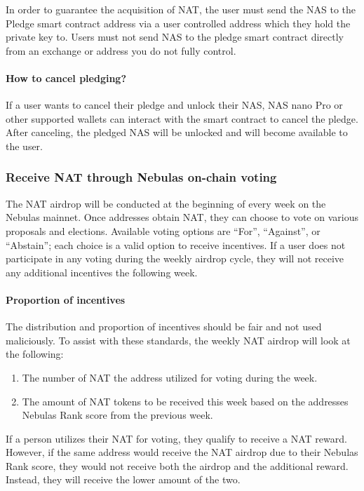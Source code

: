 In order to guarantee the acquisition of NAT, the user must send the NAS to the Pledge smart contract address via a user controlled address which they hold the private key to. Users must not send NAS to the pledge smart contract directly from an exchange or address you do not fully control.


\paragraph{How to cancel pledging?}

If a user wants to cancel their pledge and unlock their NAS, NAS nano Pro or other supported wallets can interact with the smart contract to cancel the pledge. After canceling, the pledged NAS will be unlocked and will become available to the user.

\subsubsection{Receive NAT through Nebulas on-chain voting}

The NAT airdrop will be conducted at the beginning of every week on the Nebulas
mainnet. Once addresses obtain NAT, they can choose to vote on various
proposals and elections. Available voting options are ``For'', ``Against'', or
``Abstain''; each choice is a valid option to receive incentives. If a user does not participate in any voting during the weekly airdrop cycle, they will not receive any additional incentives the following week.


\paragraph{Proportion of incentives}

The distribution and proportion of incentives should be fair and not used maliciously. To assist with these standards, the weekly NAT airdrop will look at the following:

\begin{enumerate}
	\item The number of NAT the address utilized for voting during the week.
	\item The amount of NAT tokens to be received this week based on the addresses Nebulas Rank score from the previous week.
\end{enumerate}

If a person utilizes their NAT for voting, they qualify to receive a NAT reward. However, if the same address would receive the NAT airdrop due to their Nebulas Rank score, they would not receive both the airdrop and the additional reward. Instead, they will receive the lower amount of the two.

